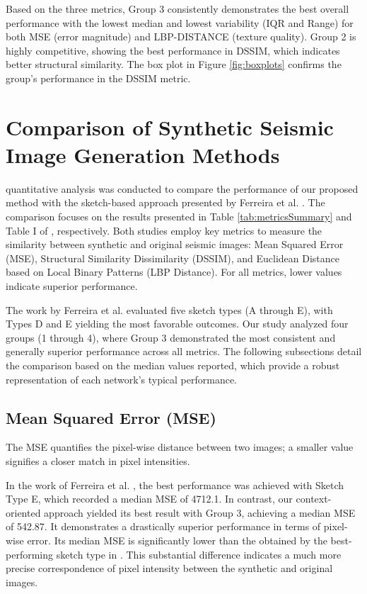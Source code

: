 \documentclass{ieeeaccess}
\begin{document}
Based on the three metrics, Group 3 consistently demonstrates the best overall performance with the lowest median and lowest variability (IQR and Range) for both MSE (error magnitude) and LBP-DISTANCE (texture quality). Group 2 is highly competitive, showing the best performance in DSSIM, which indicates better structural similarity. The box plot in Figure \ref{fig:boxplots} confirms the group's performance in the DSSIM metric.

\section{Comparison of Synthetic Seismic Image Generation Methods}

 quantitative analysis was conducted to compare the performance of our proposed method with the sketch-based approach presented by Ferreira et al. \cite{ref19}. The comparison focuses on the results presented in Table \ref{tab:metricsSummary} and Table I of \cite{ref19}, respectively. Both studies employ key metrics to measure the similarity between synthetic and original seismic images: Mean Squared Error (MSE), Structural Similarity Dissimilarity (DSSIM), and Euclidean Distance based on Local Binary Patterns (LBP Distance). For all metrics, lower values indicate superior performance.

The work by Ferreira et al. \cite{ref19} evaluated five sketch types (A through E), with Types D and E yielding the most favorable outcomes. Our study analyzed four groups (1 through 4), where Group 3 demonstrated the most consistent and generally superior performance across all metrics. The following subsections detail the comparison based on the median values reported, which provide a robust representation of each network's typical performance.

\subsection{Mean Squared Error (MSE)}

The MSE quantifies the pixel-wise distance between two images; a smaller value signifies a closer match in pixel intensities.

In the work of Ferreira et al. \cite{ref19}, the best performance was achieved with Sketch Type E, which recorded a median MSE of 4712.1. In contrast, our context-oriented approach yielded its best result with Group 3, achieving a median MSE of 542.87. It demonstrates a drastically superior performance in terms of pixel-wise error. Its median MSE is significantly lower than the obtained by the best-performing sketch type in \cite{ref19}. This substantial difference indicates a much more precise correspondence of pixel intensity between the synthetic and original images.
\end{document}
